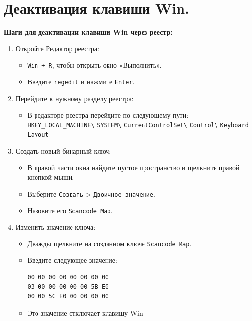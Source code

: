 \documentclass[a4paper, 14pt]{report}
\begin{document}
\section{Деактивация клавиши Win.}
\textbf{Шаги для деактивации клавиши Win через реестр:}
\begin{enumerate}
    \item {Откройте Редактор реестра:
          \begin{itemize}
              \item \verb|Win + R|, чтобы открыть окно «Выполнить».
              \item Введите \verb|regedit| и нажмите \verb|Enter|.
          \end{itemize}
          }
    \item {Перейдите к нужному разделу реестра:
          \begin{itemize}
              \item В редакторе реестра перейдите по следующему пути:\\
                    \verb|HKEY_LOCAL_MACHINE\|
                    \verb|SYSTEM\|
                    \verb|CurrentControlSet\|
                    \verb|Control\|
                    \verb|Keyboard Layout|
          \end{itemize}
          }
    \item {Создать новый бинарный ключ:
          \begin{itemize}
              \item В правой части окна найдите пустое пространство и щелкните правой кнопкой мыши.
              \item Выберите \verb|Создать| > \verb|Двоичное значение|.
              \item Назовите его \verb|Scancode Map|.
          \end{itemize}
          }
    \item {Изменить значение ключа:
          \begin{itemize}
              \item Дважды щелкните на созданном ключе \verb|Scancode Map|.
              \item {Введите следующее значение:
                    \begin{lstlisting}
00 00 00 00 00 00 00 00
03 00 00 00 00 00 5B E0
00 00 5C E0 00 00 00 00
                    \end{lstlisting}}
              \item Это значение отключает клавишу Win.
                    \begin{figure}[H]

\end{figure}
\end{itemize}}
\end{enumerate}
\end{document}
